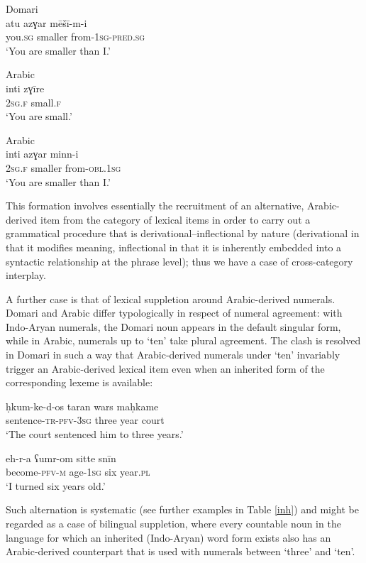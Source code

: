 \documentclass[output=paper]{langsci/langscibook}
\begin{document}
\ex
{Domari}\\
\gll atu azɣar mēšī-m-i    \\
           you.\textsc{sg} smaller from-\textsc{1sg-pred.sg}\\
\glt       ‘You are smaller than I.’

\ex
{Arabic}\\
\gll inti zɣīre    \\
           \textsc{2sg.f} small.\textsc{f}\\
\glt       ‘You are small.’

\ex
{Arabic}\\
\gll inti azɣar minn-i    \\
           \textsc{2sg.f} smaller from-\textsc{obl.1sg}\\
\glt       ‘You are smaller than I.’
\z
\z


This formation involves essentially the recruitment of an alternative, Arabic-derived item from the category of lexical items in order to carry out a grammatical procedure that is derivational–inflectional by nature (derivational in that it modifies meaning, inflectional in that it is inherently embedded into a syntactic relationship at the phrase level); thus we have a case of cross-category interplay.

A further case is that of lexical suppletion around Arabic-derived numerals. Domari and Arabic differ typologically in respect of numeral agreement: with Indo-Aryan numerals, the Domari noun appears in the default singular form, while in Arabic, numerals up to `ten' take plural agreement. The clash is resolved in Domari in such a way that Arabic-derived numerals under `ten' invariably trigger an Arabic-derived lexical item even when an inherited form of the corresponding lexeme is available:

\ea
\ea
\gll ḥkum-ke-d-os taran  wars maḥkame\\
           sentence-\textsc{tr-pfv-3sg} three year court\\
\glt       ‘The court sentenced him to three years.’

\ex
\gll eh-r-a  ʕumr-om sitte snīn\\
           become-\textsc{pfv-m} age-\textsc{1sg} six year\textsc{.pl}\\
\glt       ‘I turned six years old.’
\z
\z

Such alternation is systematic (see further examples in Table \ref{inh}) and might be regarded as a case of bilingual suppletion, where every countable noun in the language for which an inherited (Indo-Aryan) word form exists also has an Arabic-derived counterpart that is used with numerals between `three' and `ten'.
\\
\end{document}
